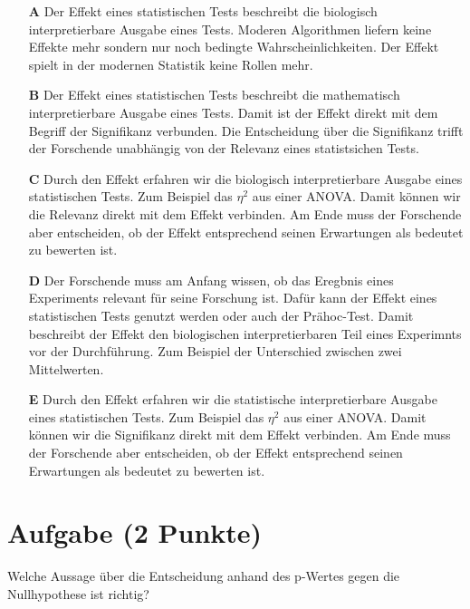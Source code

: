 \documentclass[a4paper, 9pt]{scrartcl}\usepackage[]{graphicx}\usepackage[]{xcolor}
\begin{document}
\begin{enumerate}
\item [\textbf{A} \msquare] Der Effekt eines statistischen Tests beschreibt die biologisch interpretierbare Ausgabe eines Tests. Moderen Algorithmen liefern keine Effekte mehr sondern nur noch bedingte Wahrscheinlichkeiten. Der Effekt spielt in der modernen Statistik keine Rollen mehr.
\item [\textbf{B} \msquare] Der Effekt eines statistischen Tests beschreibt die mathematisch interpretierbare Ausgabe eines Tests. Damit ist der Effekt direkt mit dem Begriff der Signifikanz verbunden. Die Entscheidung über die Signifikanz trifft der Forschende unabhängig von der Relevanz eines statistsichen Tests.
\item [\textbf{C} \msquare] Durch den Effekt erfahren wir die biologisch interpretierbare Ausgabe eines statistischen Tests. Zum Beispiel das $\eta^2$ aus einer ANOVA. Damit können wir die Relevanz direkt mit dem Effekt verbinden. Am Ende muss der Forschende aber entscheiden, ob der Effekt entsprechend seinen Erwartungen als bedeutet zu bewerten ist.
\item [\textbf{D} \msquare] Der Forschende muss am Anfang wissen, ob das Eregbnis eines Experiments relevant für seine Forschung ist. Dafür kann der Effekt eines statistischen Tests genutzt werden oder auch der Prähoc-Test. Damit beschreibt der Effekt den biologischen interpretierbaren Teil eines Experimnts vor der Durchführung. Zum Beispiel der Unterschied zwischen zwei Mittelwerten.
\item [\textbf{E} \msquare] Durch den Effekt erfahren wir die statistische interpretierbare Ausgabe eines statistischen Tests. Zum Beispiel das $\eta^2$ aus einer ANOVA. Damit können wir die Signifikanz direkt mit dem Effekt verbinden. Am Ende muss der Forschende aber entscheiden, ob der Effekt entsprechend seinen Erwartungen als bedeutet zu bewerten ist.
\end{enumerate}

\section{Aufgabe \hfill (2 Punkte)}



Welche Aussage über die Entscheidung anhand des p-Wertes gegen die
Nullhypothese ist richtig?
\end{document}
